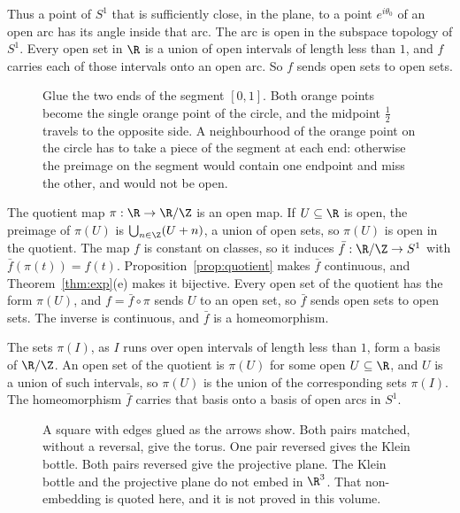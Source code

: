 Thus a point of $S^1$ that is sufficiently close, in the plane, to a point $e^{i\theta_0}$ of an open arc has its angle inside that arc. The arc is open in the subspace topology of $S^1$. Every open set in $\R$ is a union of open intervals of length less than $1$, and $f$ carries each of those intervals onto an open arc. So $f$ sends open sets to open sets.

\begin{figure}[ht]
\centering
{}
\caption{Glue the two ends of the segment $[0,1]$. Both orange points become the single orange point of the circle, and the midpoint $\frac12$ travels to the opposite side. A neighbourhood of the orange point on the circle has to take a piece of the segment at each end: otherwise the preimage on the segment would contain one endpoint and miss the other, and would not be open.}
\label{fig:ch03-ends}
\end{figure}

The quotient map $\pi:\R\to\R/\Z$ is an open map. If $U\subseteq\R$ is open, the preimage of $\pi(U)$ is $\bigcup_{n\in\Z}(U+n)$, a union of open sets, so $\pi(U)$ is open in the quotient. The map $f$ is constant on classes, so it induces $\bar f:\R/\Z\to S^1$ with $\bar f(\pi(t))=f(t)$. Proposition~\ref{prop:quotient} makes $\bar f$ continuous, and Theorem~\ref{thm:exp}(e) makes it bijective. Every open set of the quotient has the form $\pi(U)$, and $f=\bar f\circ\pi$ sends $U$ to an open set, so $\bar f$ sends open sets to open sets. The inverse is continuous, and $\bar f$ is a homeomorphism.

The sets $\pi(I)$, as $I$ runs over open intervals of length less than $1$, form a basis of $\R/\Z$. An open set of the quotient is $\pi(U)$ for some open $U\subseteq\R$, and $U$ is a union of such intervals, so $\pi(U)$ is the union of the corresponding sets $\pi(I)$. The homeomorphism $\bar f$ carries that basis onto a basis of open arcs in $S^1$.

\begin{figure}[ht]
\centering
{}
\caption{A square with edges glued as the arrows show. Both pairs matched, without a reversal, give the torus. One pair reversed gives the Klein bottle. Both pairs reversed give the projective plane. The Klein bottle and the projective plane do not embed in $\R^3$. That non-embedding is quoted here, and it is not proved in this volume.}
\label{fig:gluing}
\end{figure}

